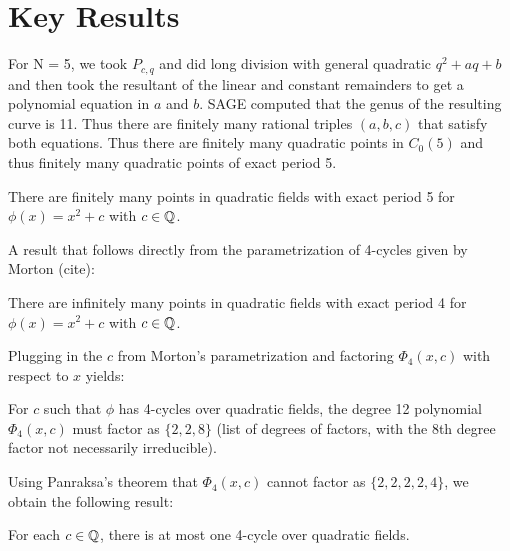 \section{Key Results}

For N = 5, we took $P_{c,q}$ and did long division with general
quadratic $q^2 + aq + b$ and then took the resultant of the linear and
constant remainders to get a polynomial equation in $a$ and $b$. SAGE
computed that the genus of the resulting curve is 11. Thus there are
finitely many rational triples $(a,b,c)$ that satisfy both
equations. Thus there are finitely many quadratic points in $C_0(5)$
and thus finitely many quadratic points of exact period 5.
\begin{theorem}
  There are finitely many points in quadratic fields with exact period
  5 for $\phi(x) = x^2 + c$ with $c \in \mathbb{Q}$.
\end{theorem}

A result that follows directly from the parametrization of 4-cycles
given by Morton (cite):
\begin{theorem}
  There are infinitely many points in quadratic fields with exact
  period 4 for $\phi(x) = x^2 + c$ with $c \in \mathbb{Q}$.
\end{theorem}

Plugging in the $c$ from Morton's parametrization and factoring
$\Phi_4(x,c)$ with respect to $x$ yields:
\begin{lemma}
  For $c$ such that $\phi$ has 4-cycles over quadratic fields, the
  degree 12 polynomial $\Phi_4(x,c)$ must factor as $\{2,2,8\}$ (list
  of degrees of factors, with the 8th degree factor not necessarily
  irreducible).
\end{lemma}

Using Panraksa's theorem that $\Phi_4(x,c)$ cannot factor as
$\{2,2,2,2,4\}$, we obtain the following result:
\begin{theorem}
  For each $c \in \mathbb{Q}$, there is at most one 4-cycle over quadratic
  fields.
\end{theorem}

{}



